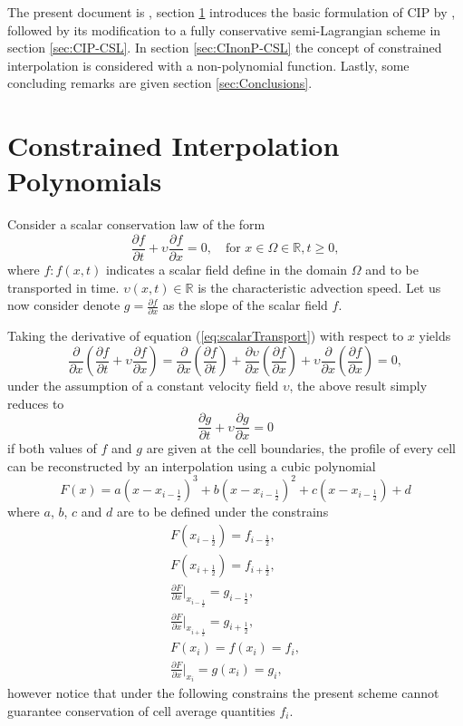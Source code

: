 \documentclass[10pt,a4paper]{article}
\newcommand{\pd}[2]{\frac{\partial #1}{\partial #2}}
\begin{document}
The present document is , section \ref{sec:CIP} introduces the basic formulation of CIP by \cite{Yabe1991}, followed by its modification to a fully conservative semi-Lagrangian scheme in section \ref{sec:CIP-CSL}. In section \ref{sec:CInonP-CSL} the concept of constrained interpolation is considered with a non-polynomial function. Lastly, some concluding remarks are given section \ref{sec:Conclusions}.

\section{Constrained Interpolation Polynomials}
\label{sec:CIP}

Consider a scalar conservation law of the form
%
\begin{equation}
	\pd{f}{t} + \upsilon \pd{f}{x} = 0, 
	\quad\text{for } x\in\Omega\in\mathbb{R},t\geqslant0, 
	\label{eq:scalarTransport}
\end{equation}
%
where $f:f(x,t)$ indicates a scalar field define in the domain $\Omega$ and to be transported in time. $\upsilon(x,t)\in\mathbb{R}$ is the characteristic advection speed. Let us now consider denote $g=\pd{f}{x}$ as the slope of the scalar field $f$. 

Taking the derivative of equation (\ref{eq:scalarTransport}) with respect to $x$ yields
%
\begin{equation}
	\pd{}{x}\left(\pd{f}{t} + \upsilon \pd{f}{x}\right) = 
	\pd{}{x}\left(\pd{f}{t} \right) + 
	\pd{\upsilon}{x} \left( \pd{f}{x} \right) + 
	\upsilon \pd{}{x} \left( \pd{f}{x} \right) = 0,
\end{equation}
%
under the assumption of a constant velocity field $\upsilon$, the above result simply reduces to 
% 
\begin{equation}
	\pd{g}{t} + \upsilon \pd{g}{x} = 0
	\label{eq:slopeTransport}
\end{equation}
%
if both values of $f$ and $g$ are given at the cell boundaries, the profile of every cell can be reconstructed by an interpolation using a cubic polynomial 
%
\begin{equation}
	F(x) = a \left(x-x_{i-\frac{1}{2}} \right)^3 + 
		   b \left(x-x_{i-\frac{1}{2}} \right)^2 + 
		   c \left(x-x_{i-\frac{1}{2}} \right) + d
\end{equation}
%
where $a$, $b$, $c$ and $d$ are to be defined under the constrains 
%
\begin{align}
	F(x_{i-\frac{1}{2}}) = f_{i-\frac{1}{2}}, \\
	F(x_{i+\frac{1}{2}}) = f_{i+\frac{1}{2}}, \\
	\pd{F}{x}|_{x_{i-\frac{1}{2}}} = g_{i-\frac{1}{2}}, \\
	\pd{F}{x}|_{x_{i+\frac{1}{2}}} = g_{i+\frac{1}{2}}, \\
	F(x_i) = f(x_i) = f_i, \\
	\pd{F}{x}|_{x_i} = g(x_i) = g_i,
\end{align}
% 
however notice that under the following constrains the present scheme cannot guarantee conservation of cell average quantities $f_i$.
\end{document}
